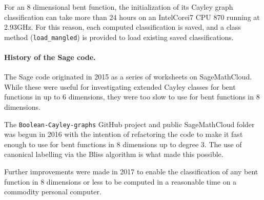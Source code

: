 \documentclass[12pt,a4paper]{article}
\begin{document}
For an 8 dimensional bent function, the initialization of its Cayley graph classification
can take more than 24 hours on an Intel\textregistered Core\texttrademark i7 CPU 870 running at 2.93GHz.
For this reason, each computed classification is saved, and a class method (\texttt{load\_mangled})
is provided to load existing saved classifications.

\paragraph*{History of the Sage code.}

The Sage code originated in 2015 as a series of worksheets on Sage\-Math\-Cloud.
While these were useful for investigating extended Cayley classes for bent functions in up to 6 dimensions,
they were too slow to use for bent functions in 8 dimensions.

The \texttt{Boolean-Cayley-graphs} GitHub project and public Sage\-Math\-Cloud folder was begun in 2016
with the intention of refactoring the code to make it fast enough to use for bent functions in 8 dimensions
up to degree 3.
The use of canonical labelling via the Bliss algorithm is what made this possible.

Further improvements were made in 2017 to enable the classification of any bent function in 8 dimensions or less
to be computed in a reasonable time on a commodity personal computer.
\end{document}
